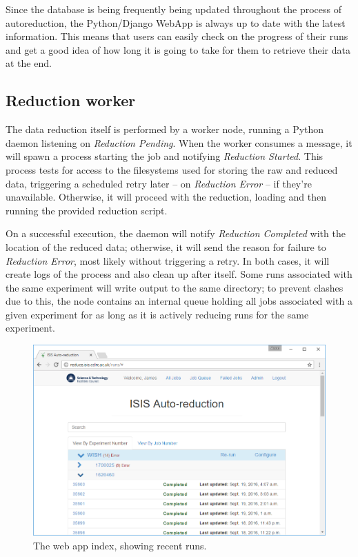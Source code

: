 \documentclass[twocolumn]{article}
\begin{document}
Since the database is being frequently being updated throughout the process of autoreduction,
the Python/Django\cite{django} WebApp is always up to date with the latest information.
This means that users can easily check on the progress of their runs and get a good idea of 
how long it is going to take for them to retrieve their data at the end.

\subsection{Reduction worker}\label{reduction-worker}

The data reduction itself is performed by a worker node, running a
Python daemon listening on \emph{Reduction Pending}. When the worker
consumes a message, it will spawn a process starting the job and
notifying \emph{Reduction Started}. This process tests for access to the
filesystems used for storing the raw and reduced data, triggering a
scheduled retry later -- on \emph{Reduction Error} -- if they're
unavailable. Otherwise, it will proceed with the reduction, loading and
then running the provided reduction script.

On a successful execution, the daemon will notify \emph{Reduction Completed} with
the location of the reduced data; otherwise, it will send the reason for
failure to \emph{Reduction Error}, most likely without triggering a
retry. In both cases, it will create logs of the process and also clean up
after itself. Some runs associated with the same experiment will write
output to the same directory; to prevent clashes due to this, the node
contains an internal queue holding all jobs associated with a given
experiment for as long as it is actively reducing runs for the
same experiment.


\begin{figure}
\centering\includegraphics[width=0.8\linewidth]{index.png}
\caption{The web app index, showing recent runs.}
\end{figure}
\end{document}

